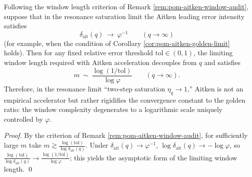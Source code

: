 \begin{corollary}\label{cor:pom-aitken-window-golden-invariance}
Following the window length criterion of Remark \ref{rem:pom-aitken-window-audit},
suppose that in the resonance saturation limit the Aitken leading error intensity satisfies
\[
\delta_{\mathrm{ait}}(q)\ \longrightarrow\ \varphi^{-1}
\qquad(q\to\infty)
\]
(for example, when the condition of Corollary \ref{cor:pom-aitken-golden-limit} holds).
Then for any fixed relative error threshold \(\mathrm{tol}\in(0,1)\), the limiting window length required with Aitken acceleration decouples from \(q\) and satisfies
\[
m\ \sim\ \frac{\log(1/\mathrm{tol})}{\log\varphi}
\qquad(q\to\infty).
\]
Therefore, in the resonance limit ``two-step saturation \(\eta_q\to 1\),'' Aitken is not an empirical accelerator but rather rigidifies the convergence constant to the golden ratio: the window complexity degenerates to a logarithmic scale uniquely controlled by \(\varphi\).
\end{corollary}
\begin{proof}
By the criterion of Remark \ref{rem:pom-aitken-window-audit},
for sufficiently large \(m\) take
\(
m\gtrsim \frac{\log(\mathrm{tol})}{\log\delta_{\mathrm{ait}}(q)}
\).
Under \(\delta_{\mathrm{ait}}(q)\to\varphi^{-1}\),
\(
\log\delta_{\mathrm{ait}}(q)\to -\log\varphi
\),
so
\(
\frac{\log(\mathrm{tol})}{\log\delta_{\mathrm{ait}}(q)}\to \frac{\log(1/\mathrm{tol})}{\log\varphi}
\);
this yields the asymptotic form of the limiting window length. \qed
\end{proof}



